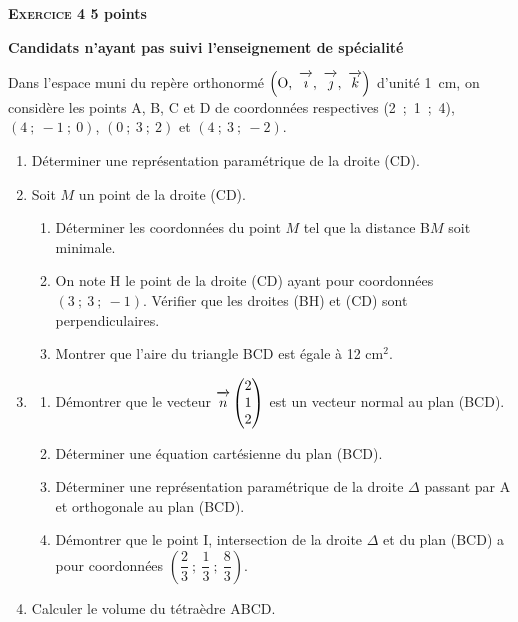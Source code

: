\documentclass[10pt,a4paper]{article}
\newcommand{\vect}[1]{\overrightarrow{\,\mathstrut#1\,}}
\def\Oijk{$\left(\text{O},~\vect{\imath},~\vect{\jmath},~\vect{k}\right)$}
\begin{document}
\vspace{0,5cm}

\textbf{\textsc{Exercice 4} \hfill 5 points}
 
\textbf{Candidats n'ayant pas suivi l'enseignement de spécialité}

\medskip

Dans l'espace muni du repère orthonormé \Oijk{} d'unité 1~cm, on considère les points
A, B, C et D de coordonnées respectives (2~;~1~;~4), $(4~;~-1~;~0)$, $(0~;~3~;~2)$ et $(4~;~3~;~-2)$.

\medskip

\begin{enumerate}
\item Déterminer une représentation paramétrique de la droite (CD).
\item Soit $M$ un point de la droite (CD).
	\begin{enumerate}
		\item Déterminer les coordonnées du point $M$ tel que la distance B$M$ soit minimale.
		\item On note H le point de la droite (CD) ayant pour coordonnées $(3~;~3~;~- 1)$.
Vérifier que les droites (BH) et (CD) sont perpendiculaires.
		\item Montrer que l'aire du triangle BCD est égale à 12 cm$^2$.
	\end{enumerate}
\item 
	\begin{enumerate}
		\item Démontrer que le vecteur $\vect{n}\begin{pmatrix}2\\1\\2\end{pmatrix}$  est un vecteur normal au plan (BCD).
		\item Déterminer une équation cartésienne du plan (BCD).
		\item Déterminer une représentation paramétrique de la droite $\Delta$ passant par A et orthogonale
au plan (BCD).
		\item Démontrer que le point I, intersection de la droite $\Delta$ et du plan (BCD) a pour
coordonnées $\left(\dfrac{2}{3}~;~\dfrac{1}{3}~;~\dfrac{8}{3}\right)$.
	\end{enumerate}
\item  Calculer le volume du tétraèdre ABCD.
\end{enumerate}
\end{document}
